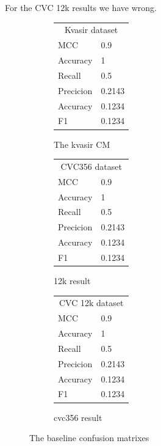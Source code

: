 For the CVC 12k results we have wrong. 

\begin{figure}
     \centering
     \begin{subfigure}[b]{0.3\textwidth}
         \centering
		\begin{tabular}{ll}
		\multicolumn{2}{c}{Kvasir dataset}        \\
		MCC & 0.9    \\
		Accuracy                         & 1      \\
		Recall                              & 0.5    \\
		Precicion                        & 0.2143 \\
		Accuracy                        & 0.1234 \\
		F1                                     & 0.1234
		\end{tabular}
    \caption{The kvasir CM}
    \label{mat:kvasirCM}
    \end{subfigure}
    \hfill
    \begin{subfigure}[b]{0.3\textwidth}
      \centering
		\begin{tabular}{ll}
		\multicolumn{2}{c}{CVC356 dataset}        \\
		MCC & 0.9    \\
		Accuracy                         & 1      \\
		Recall                              & 0.5    \\
		Precicion                        & 0.2143 \\
		Accuracy                        & 0.1234 \\
		F1                                     & 0.1234
		\end{tabular}
    \caption{12k result}
    \label{mat:cvc12kCM}
    \end{subfigure}
    \hfill
    \begin{subfigure}[b]{0.3\textwidth}
         \centering
		\begin{tabular}{ll}
		\multicolumn{2}{c}{CVC 12k dataset}        \\
		MCC & 0.9    \\
		Accuracy                         & 1      \\
		Recall                              & 0.5    \\
		Precicion                        & 0.2143 \\
		Accuracy                        & 0.1234 \\
		F1                                     & 0.1234
		\end{tabular}
   \caption{cvc356 result}
   \label{mat:cvc356CM}
   \end{subfigure}
   \caption{The baseline confusion matrixes}
   \label{fig:BaselineCM}
\end{figure}









